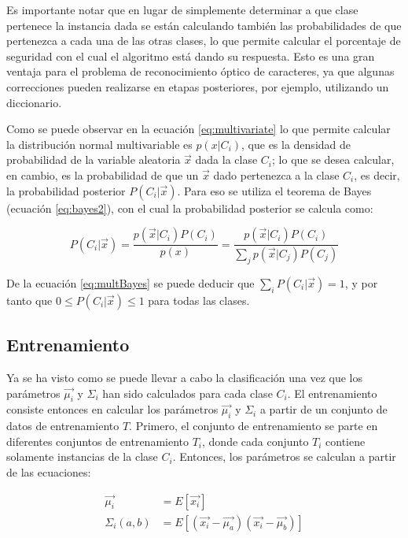 \documentclass[a4paper, 11pt, oneside]{report}
\begin{document}
Es importante notar que en lugar de simplemente determinar a que clase pertenece la instancia dada se están calculando también las probabilidades de que pertenezca a cada una de las otras clases, lo que permite calcular el porcentaje de seguridad con el cual el algoritmo está dando su respuesta. Esto es una gran ventaja para el problema de reconocimiento óptico de caracteres, ya que algunas correcciones pueden realizarse en etapas posteriores, por ejemplo, utilizando un diccionario.

Como se puede observar en la ecuación \eqref{eq:multivariate} lo que permite calcular la distribución normal multivariable es $p(x|C_i)$, que es la densidad de probabilidad de la variable aleatoria $\vec{x}$ dada la clase $C_i$; lo que se desea calcular, en cambio, es la probabilidad de que un $\vec{x}$ dado pertenezca a la clase $C_i$, es decir, la probabilidad posterior $P(C_i|\vec{x})$. Para eso se utiliza el teorema de Bayes (ecuación \ref{eq:bayes2}), con el cual la probabilidad posterior se calcula como:

	\begin{equation}\label{eq:multBayes}
		P(C_i|\vec{x}) = \frac{p(\vec{x}|C_i)P(C_i)}{p(x)} = \frac{p(\vec{x}|C_i)P(C_i)}{ \sum_j{p(\vec{x}|C_j)P(C_j)} }
	\end{equation}
	
De la ecuación \ref{eq:multBayes} se puede deducir que $\sum_i{P(C_i|\vec{x})}=1$, y por tanto que $0 \le P(C_i|\vec{x}) \le 1$ para todas las clases.
	
\subsection{Entrenamiento}

Ya se ha visto como se puede llevar a cabo la clasificación una vez que los parámetros $\vec{\mu_i}$ y $\Sigma_i$ han sido calculados para cada clase $C_i$. El entrenamiento consiste entonces en calcular los parámetros $\vec{\mu_i}$ y $\Sigma_i$ a partir de un conjunto de datos de entrenamiento $T$. Primero, el conjunto de entrenamiento se parte en diferentes conjuntos de entrenamiento $T_i$, donde cada conjunto $T_i$ contiene solamente instancias de la clase $C_i$. Entonces, los parámetros se calculan a partir de las ecuaciones:

	\begin{equation}\label{eq:multiParams}
	\begin{aligned}
		\vec{\mu_i} &= E[ \vec{x_i} ] \\
		\Sigma_i(a,b) &= E[ (\vec{x_i}-\vec{\mu_a})(\vec{x_i}-\vec{\mu_b}) ]
	\end{aligned}
	\end{equation}
\end{document}

